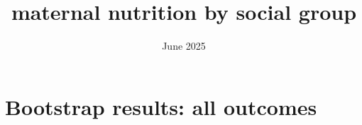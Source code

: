 \documentclass{article}
\title{maternal nutrition by social group}
\date{June 2025}
\begin{document}
\maketitle


\section{Bootstrap results: all outcomes}

\begin{table}[H]
    \centering
    \footnotesize %
    \label{tab:sumstat}
\end{table}








\end{document}
